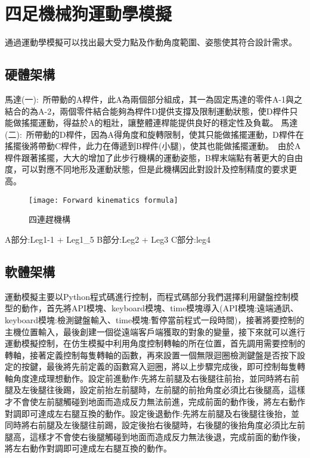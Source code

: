 \chapter{四足機械狗運動學模擬}

通過運動學模擬可以找出最大受力點及作動角度範圍、姿態使其符合設計需求。\\

\section{硬體架構}

馬達(一):\
所帶動的A桿件，此A為兩個部分組成，其一為固定馬達的零件A-1與之結合的為A-2，兩個零件結合能夠為桿件D提供支撐及限制運動狀態，使D桿件只能做搖擺運動，得益於A的粗壯，讓整體連桿能提供良好的穩定性及負載。
馬達(二):\
所帶動的D桿件，因為A得角度和旋轉限制，使其只能做搖擺運動，D桿件在搖擺後將帶動C桿件，此力在傳遞到B桿件(小腿)，使其也能做搖擺運動。\
由於A桿件跟著搖擺，大大的增加了此步行機構的運動姿態，B桿末端點有著更大的自由度，可以對應不同地形及運動狀態，但是此機構因此對設計及控制精度的要求更高。\\

\begin{figure}[hbt!]
\begin{center}
\texttt{[image: Forward kinematics formula]}
\caption{\Large 四連趕機構}\label{Forward kinematics formula}
\end{center}
\end{figure}

A部分:Leg1-1 + Leg1_5
B部分:Leg2 + Leg3
C部分:leg4

\section{軟體架構}
運動模擬主要以Python程式碼進行控制，而程式碼部分我們選擇利用鍵盤控制模型的動作，首先將API模塊、keyboard模塊、time模塊導入(API模塊:遠端通訊、keyboard模塊:檢測鍵盤輸入、time模塊:暫停當前程式一段時間)，接著將要控制的主機位置輸入，最後創建一個從遠端客戶端獲取的對象的變量，接下來就可以進行運動模擬控制，在仿生模擬中利用角度控制轉軸的所在位置，首先調用需要控制的轉軸，接著定義控制每隻轉軸的函數，再來設置一個無限迴圈檢測鍵盤是否按下設定的按鍵，最後將先前定義的函數寫入迴圈，將以上步驟完成後，即可控制每隻轉軸角度達成理想動作。設定前進動作:先將左前腿及右後腿往前抬，並同時將右前腿及左後腿往後踢，設定前抬左前腿時，左前腿的前抬角度必須比右後腿高，這樣才不會使左前腿觸碰到地面而造成反力無法前進，完成前面的動作後，將左右動作對調即可達成左右腿互換的動作。設定後退動作:先將左前腿及右後腿往後抬，並同時將右前腿及左後腿往前踢，設定後抬右後腿時，右後腿的後抬角度必須比左前腿高，這樣才不會使右後腿觸碰到地面而造成反力無法後退，完成前面的動作後，將左右動作對調即可達成左右腿互換的動作。\\
\newpage

